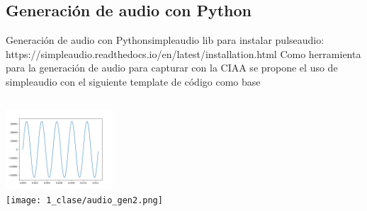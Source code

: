  \subsection{Generación de audio con Python}
 \begin{frame}{Generación de audio con Python}{simpleaudio lib}
    \handsonicon
    \tiny{para instalar pulseaudio: https://simpleaudio.readthedocs.io/en/latest/installation.html}
    Como herramienta para la generación de audio para capturar con la CIAA se propone el uso de simpleaudio con el siguiente template de código como base
    \begin{columns}[onlytextwidth]
       
       \includegraphics[width=4cm]{1_clase/audio_gen1.png}\\
       \texttt{[image: 1\_clase/audio\_gen2.png]}
    \end{columns}
    \vfill
 \end{frame}
